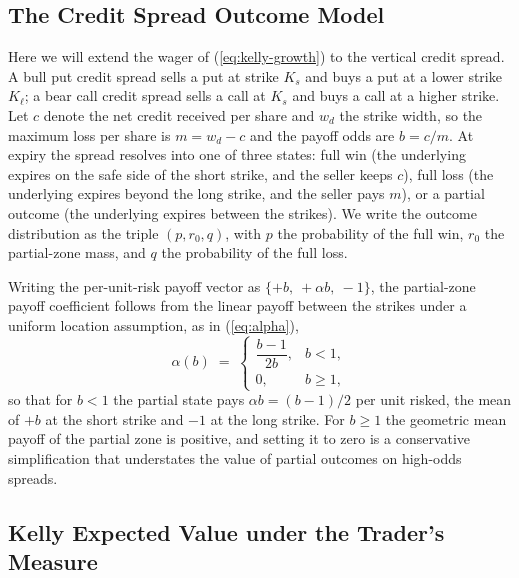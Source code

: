 \documentclass[11pt]{article}
\begin{document}
\subsection{The Credit Spread Outcome Model}
\label{sec:instruments}

Here we will extend the wager of (\ref{eq:kelly-growth}) to the vertical
credit spread. A bull put credit spread sells a put at strike $K_s$ and buys
a put at a lower strike $K_\ell$; a bear call credit spread sells a call at
$K_s$ and buys a call at a higher strike. Let $c$ denote the net credit
received per share and $w_d$ the strike width, so the maximum loss per share
is $m = w_d - c$ and the payoff odds are $b = c / m$. At expiry the spread
resolves into one of three states: full win (the underlying expires on the
safe side of the short strike, and the seller keeps $c$), full loss (the
underlying expires beyond the long strike, and the seller pays $m$), or a
partial outcome (the underlying expires between the strikes). We write the
outcome distribution as the triple $(p, r_0, q)$, with $p$ the probability of
the full win, $r_0$ the partial-zone mass, and $q$ the probability of the
full loss.

Writing the per-unit-risk payoff vector as $\{+b,\ +\alpha b,\ -1\}$, the
partial-zone payoff coefficient follows from the linear payoff between the
strikes under a uniform location assumption, as in (\ref{eq:alpha}),
\begin{equation}
\alpha(b) \;=\;
\begin{cases}
\dfrac{b - 1}{2b}, & b < 1,\\[4pt]
0, & b \geq 1,
\end{cases}
\label{eq:alpha}
\end{equation}
so that for $b < 1$ the partial state pays $\alpha b = (b-1)/2$ per unit
risked, the mean of $+b$ at the short strike and $-1$ at the long strike. For
$b \geq 1$ the geometric mean payoff of the partial zone is positive, and
setting it to zero is a conservative simplification that understates the
value of partial outcomes on high-odds spreads.

\subsection{Kelly Expected Value under the Trader's Measure}
\label{sec:growth}
\end{document}
